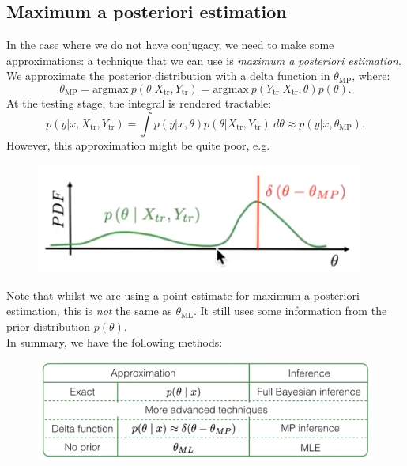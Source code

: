 \subsection{Maximum a posteriori estimation}
In the case where we do not have conjugacy, we need to make some approximations: a technique that we can use is \textit{maximum a posteriori estimation}. We approximate the posterior distribution with a delta function in $\theta_{\text{MP}}$, where:
\begin{equation*}
\theta_{\text{MP}} = \textrm{argmax}\ p(\theta | X_{\text{tr}}, Y_{\text{tr}}) = \textrm{argmax}\ p(Y_{\text{tr}} | X_{\text{tr}}, \theta) p(\theta).
\end{equation*}
At the testing stage, the integral is rendered tractable:
\begin{equation*}
p(y | x, X_{\text{tr}}, Y_{\text{tr}}) = \int p(y | x,\theta) p(\theta | X_{\text{tr}}, Y_{\text{tr}})\ d\theta \approx p(y | x, \theta_{\text{MP}}). 
\end{equation*}
However, this approximation might be quite poor, e.g.
\begin{figure}[H]
\centering
\includegraphics[scale=0.4]{poorestimate.png}
\end{figure}
Note that whilst we are using a point estimate for maximum a posteriori estimation, this is \textit{not} the same as $\theta_{\text{ML}}$. It still uses some information from the prior distribution $p(\theta)$. \\

In summary, we have the following methods:
\begin{figure}[H]
\centering
\includegraphics[scale=0.4]{methodsummary.png}
\end{figure}



